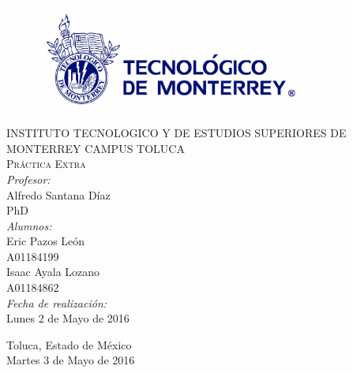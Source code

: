 \begin{titlepage}
\begin{center}
\begin{figure}[!htbp]
\centering
\includegraphics[width=90mm]{./img/logo_itesm.jpg}
\end{figure}


\textsc{ INSTITUTO TECNOLOGICO Y DE ESTUDIOS SUPERIORES DE MONTERREY
CAMPUS TOLUCA}\\[1.5cm]

\textsc{ Pr\'actica Extra }\\[0.5cm]


\emph{Profesor:}\\
 Alfredo Santana D\'iaz\\
 PhD\\
 \medskip
\emph{Alumnos:} \\
Eric Pazos Le\'on\\A01184199\\
Isaac Ayala Lozano\\A01184862\\
 \medskip
\emph{Fecha de realizaci\'on:}\\
Lunes 2 de Mayo de 2016\\
\vfill


{\large
Toluca, Estado de M\'exico\\
Martes 3 de Mayo de 2016
}

\end{center}
\end{titlepage}
